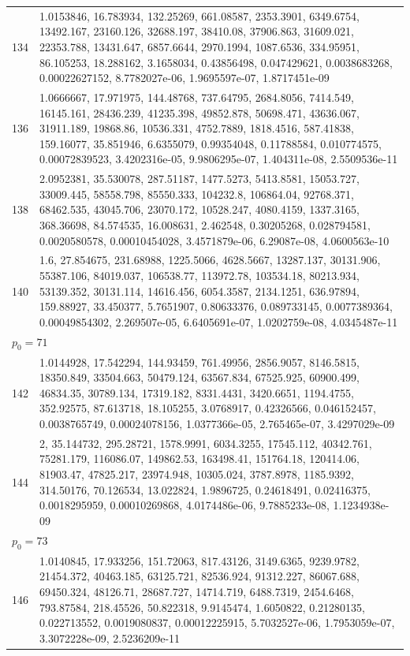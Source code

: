 \documentclass[11pt]{article}
\theoremstyle{definition}
\theoremstyle{remark}
\begin{document}
{\begin{longtable}{r p{}}
134 & 1.0153846, 16.783934, 132.25269, 661.08587, 2353.3901, 6349.6754, 13492.167, 23160.126, 32688.197, 38410.08, 37906.863, 31609.021, 22353.788, 13431.647, 6857.6644, 2970.1994, 1087.6536, 334.95951, 86.105253, 18.288162, 3.1658034, 0.43856498, 0.047429621, 0.0038683268, 0.00022627152, 8.7782027e-06, 1.9695597e-07, 1.8717451e-09 \\
136 & 1.0666667, 17.971975, 144.48768, 737.64795, 2684.8056, 7414.549, 16145.161, 28436.239, 41235.398, 49852.878, 50698.471, 43636.067, 31911.189, 19868.86, 10536.331, 4752.7889, 1818.4516, 587.41838, 159.16077, 35.851946, 6.6355079, 0.99354048, 0.11788584, 0.010774575, 0.00072839523, 3.4202316e-05, 9.9806295e-07, 1.404311e-08, 2.5509536e-11 \\
138 & 2.0952381, 35.530078, 287.51187, 1477.5273, 5413.8581, 15053.727, 33009.445, 58558.798, 85550.333, 104232.8, 106864.04, 92768.371, 68462.535, 43045.706, 23070.172, 10528.247, 4080.4159, 1337.3165, 368.36698, 84.574535, 16.008631, 2.462548, 0.30205268, 0.028794581, 0.0020580578, 0.00010454028, 3.4571879e-06, 6.29087e-08, 4.0600563e-10 \\
140 & 1.6, 27.854675, 231.68988, 1225.5066, 4628.5667, 13287.137, 30131.906, 55387.106, 84019.037, 106538.77, 113972.78, 103534.18, 80213.934, 53139.352, 30131.114, 14616.456, 6054.3587, 2134.1251, 636.97894, 159.88927, 33.450377, 5.7651907, 0.80633376, 0.089733145, 0.0077389364, 0.00049854302, 2.269507e-05, 6.6405691e-07, 1.0202759e-08, 4.0345487e-11 \\
\multicolumn{2}{l}{$p_0 = 71$} \\
142 & 1.0144928, 17.542294, 144.93459, 761.49956, 2856.9057, 8146.5815, 18350.849, 33504.663, 50479.124, 63567.834, 67525.925, 60900.499, 46834.35, 30789.134, 17319.182, 8331.4431, 3420.6651, 1194.4755, 352.92575, 87.613718, 18.105255, 3.0768917, 0.42326566, 0.046152457, 0.0038765749, 0.00024078156, 1.0377366e-05, 2.765465e-07, 3.4297029e-09 \\
144 & 2, 35.144732, 295.28721, 1578.9991, 6034.3255, 17545.112, 40342.761, 75281.179, 116086.07, 149862.53, 163498.41, 151764.18, 120414.06, 81903.47, 47825.217, 23974.948, 10305.024, 3787.8978, 1185.9392, 314.50176, 70.126534, 13.022824, 1.9896725, 0.24618491, 0.02416375, 0.0018295959, 0.00010269868, 4.0174486e-06, 9.7885233e-08, 1.1234938e-09 \\
\multicolumn{2}{l}{$p_0 = 73$} \\
146 & 1.0140845, 17.933256, 151.72063, 817.43126, 3149.6365, 9239.9782, 21454.372, 40463.185, 63125.721, 82536.924, 91312.227, 86067.688, 69450.324, 48126.71, 28687.727, 14714.719, 6488.7319, 2454.6468, 793.87584, 218.45526, 50.822318, 9.9145474, 1.6050822, 0.21280135, 0.022713552, 0.0019080837, 0.00012225915, 5.7032527e-06, 1.7953059e-07, 3.3072228e-09, 2.5236209e-11 \\

\end{longtable}}
\end{document}
